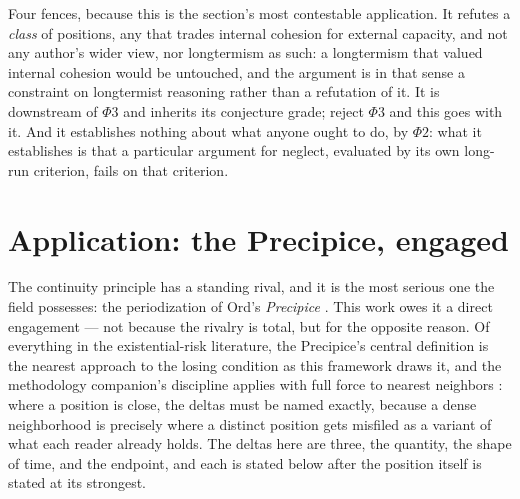 Four fences, because this is the section's most contestable
application. It refutes a \emph{class} of positions, any that trades
internal cohesion for external capacity, and not any author's wider
view, nor longtermism as such: a longtermism that valued internal
cohesion would be untouched, and the argument is in that sense a
constraint on longtermist reasoning rather than a refutation of it. It is downstream of $\Phi3$ and inherits its conjecture grade;
reject $\Phi3$ and this goes with it. And it establishes nothing about
what anyone ought to do, by $\Phi2$: what it establishes is that a
particular argument for neglect, evaluated by its own long-run
criterion, fails on that criterion.


\section{Application: the Precipice, engaged}\label{sec:precipice}

\label{gc:subsub:precipice}

The continuity principle has a standing rival, and it is the most
serious one the field possesses: the periodization of Ord's
\emph{Precipice} \cite{Ord20}. This work owes it a direct engagement
--- not because the rivalry is total, but for the opposite reason. Of
everything in the existential-risk literature, the Precipice's central
definition is the nearest approach to the losing condition as this
framework draws it, and the methodology companion's discipline applies
with full force to nearest neighbors \cite{AethusMethodology}: where a
position is close, the deltas must be named exactly, because a dense
neighborhood is precisely where a distinct position gets misfiled as a
variant of what each reader already holds. The deltas here are three, the quantity, the shape of time, and the endpoint, and each is
stated below after the position itself is stated at its strongest.

